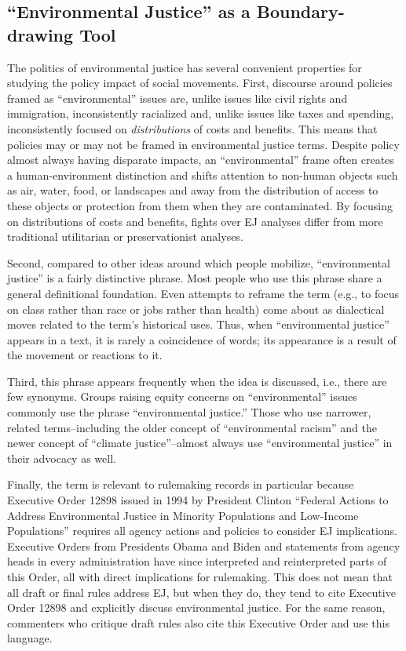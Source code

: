 \documentclass[
      12pt,
        ]{article}
\begin{document}
\hypertarget{environmental-justice-as-a-boundary-drawing-tool}{%
\subsection{``Environmental Justice'' as a Boundary-drawing Tool}\label{environmental-justice-as-a-boundary-drawing-tool}}

The politics of environmental justice has several convenient properties for studying the policy impact of social movements. First, discourse around policies framed
as ``environmental'' issues are, unlike issues like civil
rights and immigration, inconsistently racialized and, unlike issues
like taxes and spending, inconsistently focused on \emph{distributions} of
costs and benefits. This means that policies may or may not be framed in environmental justice terms. Despite policy almost always having disparate impacts, an ``environmental'' frame often creates a human-environment distinction and
shifts attention to non-human objects such as air, water, food, or
landscapes and away from the distribution of access to these objects or
protection from them when they are contaminated. By focusing on distributions of costs and benefits, fights over EJ analyses differ from more traditional utilitarian or preservationist analyses.

Second, compared to
other ideas around which people mobilize, ``environmental justice'' is a
fairly distinctive phrase. Most people who use this phrase share a
general definitional foundation. Even attempts to reframe the term (e.g., to focus on class rather than race or jobs rather than health) come about as dialectical moves related to the term's historical uses. Thus, when ``environmental justice'' appears in a text, it is rarely a coincidence of words; its appearance is a result of the movement or reactions to it.

Third, this phrase appears frequently
when the idea is discussed, i.e., there are few synonyms. Groups raising equity concerns on ``environmental'' issues commonly use the phrase ``environmental justice.'' Those who use narrower, related terms--including the older concept of
``environmental racism'' and the newer concept of ``climate justice''--almost always use ``environmental justice'' in their advocacy as well.

Finally, the term is relevant to rulemaking records in
particular because Executive Order 12898 issued in 1994 by President
Clinton ``Federal Actions to Address Environmental Justice in Minority
Populations and Low-Income Populations'' requires all agency
actions and policies to consider EJ implications. Executive Orders from Presidents Obama and Biden and statements from agency heads in every administration have since interpreted and reinterpreted parts of this Order, all with direct implications for rulemaking.
This does not mean that all draft or final rules address EJ, but when they
do, they tend to cite Executive Order 12898 and explicitly discuss
environmental justice. For the same reason, commenters who critique draft rules also cite this
Executive Order and use this language.
\end{document}
